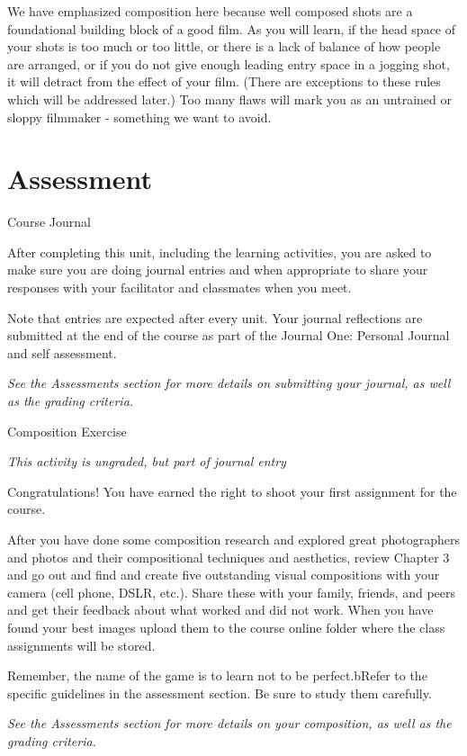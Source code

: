 \documentclass[
]{book}
\begin{document}
We have emphasized composition here because well composed shots are a foundational building block of a good film. As you will learn, if the head space of your shots is too much or too little, or there is a lack of balance of how people are arranged, or if you do not give enough leading entry space in a jogging shot, it will detract from the effect of your film. (There are exceptions to these rules which will be addressed later.) Too many flaws will mark you as an untrained or sloppy filmmaker - something we want to avoid.

\hypertarget{assessment-5}{%
\section*{Assessment}\label{assessment-5}}

\begin{assessment}
{Course Journal}

After completing this unit, including the learning activities, you are asked to make sure you are doing journal entries and when appropriate to share your responses with your facilitator and classmates when you meet.

Note that entries are expected after every unit. Your journal reflections are submitted at the end of the course as part of the Journal One: Personal Journal and self assessment.

\emph{See the Assessments section for more details on submitting your journal, as well as the grading criteria.}

{Composition Exercise}

\emph{This activity is ungraded, but part of journal entry}

Congratulations! You have earned the right to shoot your first assignment for the course.

After you have done some composition research and explored great photographers and photos and their compositional techniques and aesthetics, review Chapter 3 and go out and find and create five outstanding visual compositions with your camera (cell phone, DSLR, etc.). Share these with your family, friends, and peers and get their feedback about what worked and did not work. When you have found your best images upload them to the course online folder where the class assignments will be stored.

Remember, the name of the game is to learn not to be perfect.bRefer to the specific guidelines in the assessment section. Be sure to study them carefully.

\emph{See the Assessments section for more details on your composition, as well as the grading criteria.}
\end{assessment}
\end{document}
